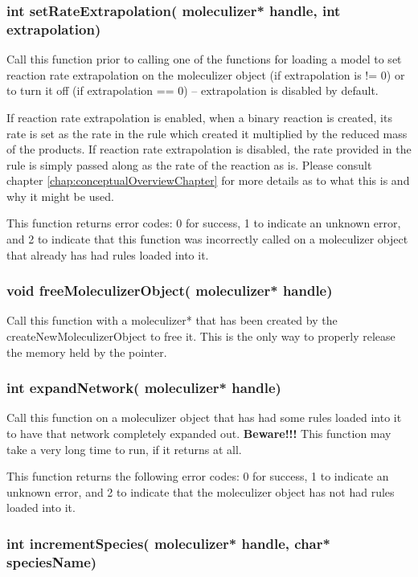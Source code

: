 \subsubsection{int setRateExtrapolation( moleculizer* handle, int
  extrapolation)}
Call this function prior to calling one of the functions for loading a
model to set reaction rate extrapolation on the moleculizer object (if
extrapolation is != 0) or to turn it off (if extrapolation == 0) --
extrapolation is disabled by default.

If reaction rate extrapolation is enabled, when a binary reaction is
created, its rate is set as the rate in the rule which created it multiplied
by the reduced mass of the products.  If reaction rate extrapolation
is disabled, the rate provided in the rule is simply passed along as
the rate of the reaction as is.  Please consult chapter
\ref{chap:conceptualOverviewChapter} for more details as to what this
is and why it might be used.

This function returns error codes: 0 for success, 1 to indicate an
unknown error, and 2 to indicate that this function was incorrectly
called on a moleculizer object that already has had rules loaded into
it.  

\subsubsection{void freeMoleculizerObject( moleculizer* handle)}
Call this function with a moleculizer* that has been created by the
createNewMoleculizerObject to free it.  This is the only way to
properly release the memory held by the pointer.

\subsubsection{int expandNetwork( moleculizer* handle)}
Call this function on a moleculizer object that has had some rules
loaded into it to have that network completely expanded out.
\textbf{Beware!!!}  This function may take a very long time to run, if
  it returns at all.  

This function returns the following error codes: 0 for success, 1 to
indicate an unknown error, and 2 to indicate that the moleculizer
object has not had rules loaded into it.  

\subsubsection{int incrementSpecies( moleculizer* handle, char*
  speciesName)}

